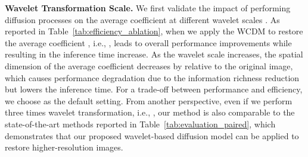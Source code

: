 \textbf{Wavelet Transformation Scale.} We first validate the impact of performing diffusion processes on the average coefficient at different wavelet scales . As reported in Table~\ref{tab:efficiency_ablation}, when we apply the WCDM to restore the average coefficient , i.e., , leads to overall performance improvements while resulting in the inference time increase. As the wavelet scale increases, the spatial dimension of the average coefficient decreases by  relative to the original image, which causes performance degradation due to the information richness reduction but lowers the inference time. For a trade-off between performance and efficiency, we choose  as the default setting. From another perspective, even if we perform three times wavelet transformation, i.e., , our method is also comparable to the state-of-the-art methods reported in Table~\ref{tab:evaluation_paired}, which demonstrates that our proposed wavelet-based diffusion model can be applied to restore higher-resolution images.
\begin{table}[!t]
	\centering
	\caption{Ablation studies of various settings on the wavelet transformation scale and sampling step, please refer to the text for more details. The results using default settings are \underline{underlined}.}
	\label{tab:efficiency_ablation}
\end{table}

